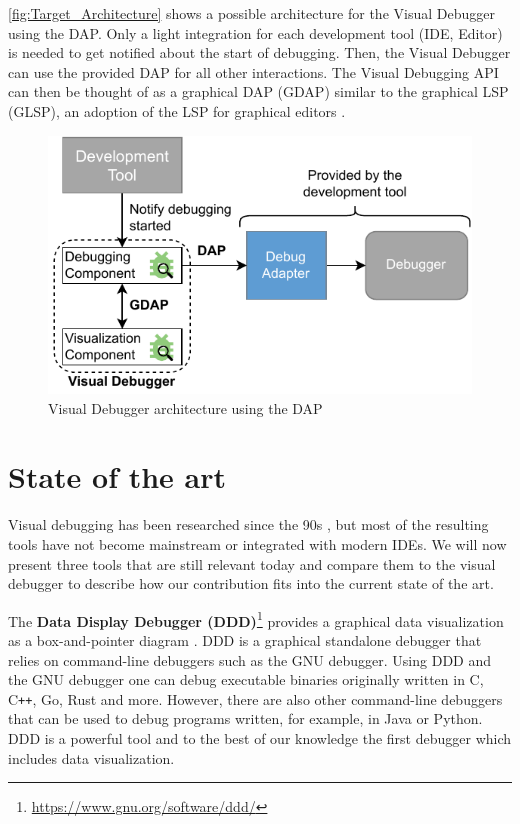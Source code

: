 \documentclass[sigconf]{acmart}
\begin{document}
\autoref{fig:Target_Architecture} shows a possible architecture for the Visual Debugger using the DAP.
Only a light integration for each development tool (IDE, Editor) is needed to get notified about the start of debugging.
Then, the Visual Debugger can use the provided DAP for all other interactions.
The Visual Debugging API can then be thought of as a graphical DAP (GDAP) similar to the graphical LSP (GLSP), an adoption of the LSP for graphical editors \cite{rodriguez-echeverriaLanguageServerProtocol2018,borkVisionFlexibleGLSPBased2024}.

\begin{figure}[ht]
  \centering
  \includegraphics[width=1\linewidth]{images/visual-debugger-Target-architecture.pdf}
  \caption{Visual Debugger architecture using the DAP}
  \label{fig:Target_Architecture}
\end{figure}

\section{State of the art} \label{sec:relatedWork}
Visual debugging has been researched since the 90s \cite{jerdingUsingVisualizationFoster1994, mukherjeaVisualDebuggingIntegrating1994, hansonSimpleExtensibleGraphical1997}, but most of the resulting tools have not become mainstream or integrated with modern IDEs.
We will now present three tools that are still relevant today and compare them to the visual debugger to describe how our contribution fits into the current state of the art.

The \textbf{Data Display Debugger (DDD)}\footnote{\url{https://www.gnu.org/software/ddd/}} provides a graphical data visualization as a box-and-pointer diagram \cite{zellerDDDFreeGraphical1996}.
DDD is a graphical standalone debugger that relies on command-line debuggers such as the GNU debugger.
Using DDD and the GNU debugger one can debug executable binaries originally written in C, C\texttt{++}, Go, Rust and more.
However, there are also other command-line debuggers that can be used to debug programs written, for example, in Java or Python.
DDD is a powerful tool and to the best of our knowledge the first debugger which includes data visualization.
\end{document}
